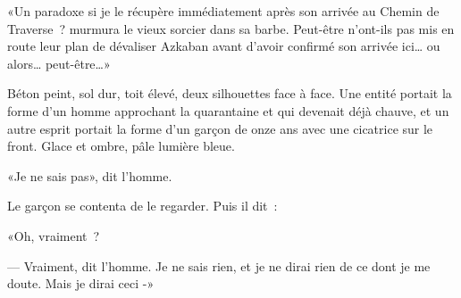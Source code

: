 «Un paradoxe si je le récupère immédiatement après son arrivée au Chemin de Traverse~? murmura le vieux sorcier dans sa barbe. Peut-être n'ont-ils pas mis en route leur plan de dévaliser Azkaban avant d'avoir confirmé son arrivée ici… ou alors… peut-être…»

\later

Béton peint, sol dur, toit élevé, deux silhouettes face à face. Une entité portait la forme d'un homme approchant la quarantaine et qui devenait déjà chauve, et un autre esprit portait la forme d'un garçon de onze ans avec une cicatrice sur le front. Glace et ombre, pâle lumière bleue.

«Je ne sais pas», dit l'homme.

Le garçon se contenta de le regarder. Puis il dit~:

«Oh, vraiment~?

--- Vraiment, dit l'homme. Je ne sais rien, et je ne dirai rien de ce dont je me doute. Mais je dirai ceci -» 

